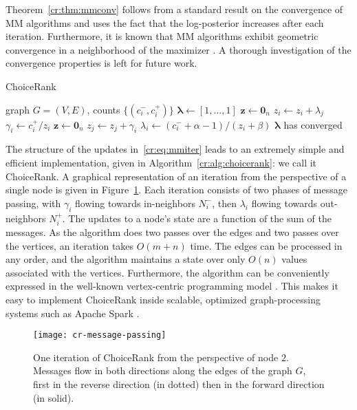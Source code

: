 Theorem~\ref{cr:thm:mmconv} follows from a standard result on the convergence of MM algorithms and uses the fact that the log-posterior increases after each iteration.
Furthermore, it is known that MM algorithms exhibit geometric convergence in a neighborhood of the maximizer \citep{lange2000optimization}.
A thorough investigation of the convergence properties is left for future work.

\begin{algorithm}[t]
  \caption{ChoiceRank}
  \label{cr:alg:choicerank}
  \begin{algorithmic}[1]
    \Require graph $G = (V, E)$, counts $\{ (c^-_i, c^+_i) \}$
    \State $\bm{\lambda} \gets [1, \ldots, 1]$
    \Repeat
      \State $\bm{z} \gets \bm{0}_n$
       $z_i \gets z_i + \lambda_j$
       $\gamma_i \gets c^+_i / z_i$
      \State $\bm{z} \gets \bm{0}_n$
       $z_j \gets z_j + \gamma_i$
       $\lambda_i \gets (c^-_i + \alpha - 1) / (z_i + \beta)$
    \Until $\bm{\lambda}$ has converged
  \end{algorithmic}
\end{algorithm}

The structure of the updates in~\eqref{cr:eq:mmiter} leads to an extremely simple and efficient implementation, given in Algorithm~\ref{cr:alg:choicerank}: we call it ChoiceRank.
A graphical representation of an iteration from the perspective of a single node is given in Figure~\ref{cr:fig:msgpassing}.
Each iteration consists of two phases of message passing, with $\gamma_i$ flowing towards in-neighbors $N^-_i$, then $\lambda_i$ flowing towards out-neighbors $N^+_i$.
The updates to a node's state are a function of the sum of the messages.
As the algorithm does two passes over the edges and two passes over the vertices, an iteration takes $O(m + n)$ time.
The edges can be processed in any order, and the algorithm maintains a state over only $O(n)$ values associated with the vertices.
Furthermore, the algorithm can be conveniently expressed in the well-known vertex-centric programming model \citep{malewicz2010pregel}.
This makes it easy to implement ChoiceRank inside scalable, optimized graph-processing systems such as Apache Spark \citep{gonzalez2014graphx}.

\begin{figure}[t]
  \centering
  \texttt{[image: cr-message-passing]}
  \caption{One iteration of ChoiceRank from the perspective of node $2$.
  Messages flow in both directions along the edges of the graph $G$, first in the reverse direction (in dotted) then in the forward direction (in solid).}
  \label{cr:fig:msgpassing}
\end{figure}

